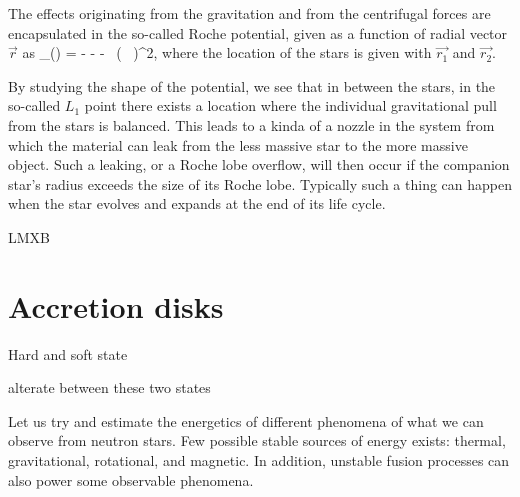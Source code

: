 The effects originating from the gravitation and from the centrifugal forces are encapsulated in the so-called Roche potential, given as a function of radial vector $\vec{r}$ as
\be
\Phi_{}() = - - -  ( \vec{ \omega } \times {} )^2,
\ee
where the location of the stars is given with $\vec{r_1}$ and $\vec{r_2}$.

By studying the shape of the potential, we see that in between the stars, in the so-called $L_1$ point there exists a location where the individual gravitational pull from the stars is balanced.
This leads to a kinda of a nozzle in the system from which the material can leak from the less massive star to the more massive object.
Such a leaking, or a Roche lobe overflow, will then occur if the companion star's radius exceeds the size of its Roche lobe.
Typically such a thing can happen when the star evolves and expands at the end of its life cycle. 

LMXB \cite{TH06}


\section{Accretion disks}



Hard and soft state \cite{HvdK89}

alterate between these two states \cite{MDF14} \cite{DGK07}


Let us try and estimate the energetics of different phenomena of what we can observe from neutron stars.
Few possible stable sources of energy exists: thermal, gravitational, rotational, and magnetic.
In addition, unstable fusion processes can also power some observable phenomena.



